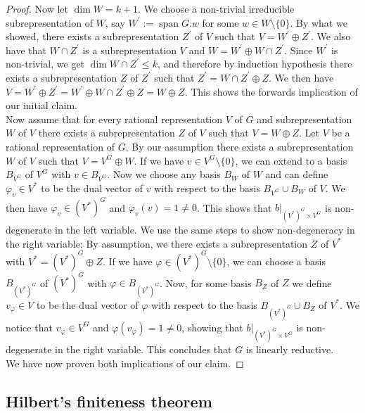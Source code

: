 \begin{proof}
  Now let $\operatorname{dim}W = k +1$.
  We choose a non-trivial irreducible subrepresentation of $W$, say $W^\prime := \operatorname{span}G.w$ for some $w \in W \setminus \{0\}$.
  By what we showed, there exists a subrepresentation $Z^\prime$ of $V$ such that $V = W^\prime \oplus Z^\prime$.
  We also have that $W \cap Z^\prime$ is a subrepresentation $V$ and $W = W^\prime \oplus W \cap Z^\prime$.
  Since $W^\prime$ is non-trivial, we get $\operatorname{dim} W \cap Z^\prime \leq k$, and therefore by induction hypothesis there exists a subrepresentation $Z$ of $Z^\prime$ such that $Z^\prime = W \cap Z^\prime \oplus Z$.
  We then have $V = W^\prime \oplus Z^\prime = W^\prime \oplus W \cap Z^\prime \oplus Z = W \oplus Z$.
  This shows the forwards implication of our initial claim.\\  
  Now assume that for every rational representation $V$ of $G$ and subrepresentation $W$ of $V$ there exists a subrepresentation $Z$ of $V$ such that $V = W \oplus Z$.
  Let $V$ be a rational representation of $G$.
  By our assumption there exists a subrepresentation $W$ of $V$ such that $V = V^G \oplus W$.
  If we have $v \in V^G \setminus \{0\}$, we can extend to a basis $B_{V^G}$ of $V^G$ with $v \in B_{V^G}$.
  Now we choose any basis $B_W$ of $W$ and can define $\varphi_v \in V^\ast$ to be the dual vector of $v$ with respect to the basis $B_{V^G} \cup B_W$ of $V$.
  We then have $\varphi_v \in (V^\ast)^G $ and $\varphi_v (v) = 1 \neq 0$.
  This shows that $\left. b\right|_{(V^\ast)^G \times V^G}$ is non-degenerate in the left variable.
  We use the same steps to show non-degeneracy in the right variable:
  By assumption, we there exists a subrepresentation $Z$ of $V^\ast$ with $V^\ast = (V^\ast)^G \oplus Z$.
  If we have $\varphi \in (V^\ast)^G \setminus\{0\}$, we can choose a basis $B_{(V^\ast)^G}$ of $(V^\ast)^G$ with $\varphi \in B_{(V^\ast)^G}$.
  Now, for some basis $B_Z$ of $Z$ we define $v_\varphi \in V$ to be the dual vector of $\varphi$ with respect to the basis $B_{(V^\ast)^G}\cup B_Z$ of $V^\ast$.
  We notice that $v_\varphi \in V^G$ and $\varphi(v_\varphi) = 1 \neq 0$, showing that $\left. b\right|_{(V^\ast)^G \times V^G}$ is non-degenerate in the right variable.
  This concludes that $G$ is linearly reductive.\\
  We have now proven both implications of our claim.
\end{proof}

\subsection{Hilbert's finiteness theorem}

